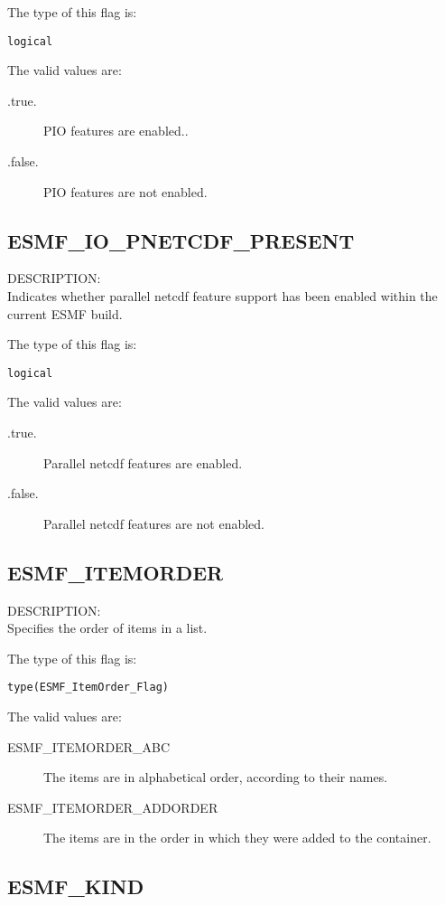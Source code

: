The type of this flag is:

{\tt logical}

The valid values are:
\begin{description}
 \item [.true.]
      PIO features are enabled..
\item [.false.]
      PIO  features are not enabled.
\end{description}

\subsection{ESMF\_IO\_PNETCDF\_PRESENT}
\label{const:iopnetcdfflag}
{\sf DESCRIPTION:\\}
Indicates whether parallel netcdf feature support has been enabled
within the current ESMF build.

The type of this flag is:

{\tt logical}

The valid values are:
\begin{description}
\item [.true.]
      Parallel netcdf features are enabled.
\item [.false.]
      Parallel netcdf features are not enabled.
\end{description}


\subsection{ESMF\_ITEMORDER}
\label{const:itemorderflag}
{\sf DESCRIPTION:\\}  
Specifies the order of items in a list.

The type of this flag is:

{\tt type(ESMF\_ItemOrder\_Flag)}

The valid values are:
\begin{description}

\item [ESMF\_ITEMORDER\_ABC]
         The items are in alphabetical order, according to their names.
\item [ESMF\_ITEMORDER\_ADDORDER]
         The items are in the order in which they were added to the container.
\end{description}


\subsection{ESMF\_KIND}
\label{const:kind}

